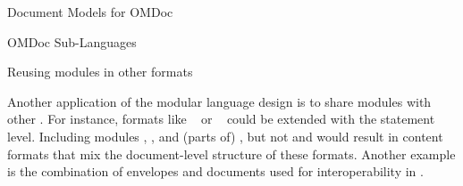 \begin{module}[id=document-model]
\begin{omgroup}[id=document-model]{Document Models for OMDoc}
\begin{omgroup}[id=sub-languages]{OMDoc Sub-Languages}
\begin{omgroup}[id=spec-intro.reusing]{Reusing \omdoc modules in other formats}

Another application of the modular language design is to share modules with other {\xml}
. For instance, formats like
{\docbook}~\cite{WalMue:dtdg99} or {\xhtml}~\cite{W3C:xhtml2000} could be extended with
the \omdoc statement level.  Including modules {}, {},
and (parts of) {}, but not {} and {} would
result in content formats that mix the document-level structure of these formats.  Another
example is the combination of {\xmlrpc} envelopes and \omdoc documents used for
interoperability in {}.
\end{omgroup}
\end{omgroup}
\end{omgroup}
\end{module}


